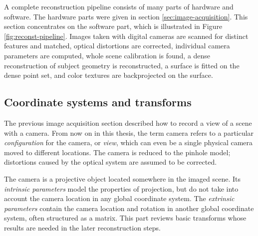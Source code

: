 A complete reconstruction pipeline consists of many parts of hardware and software.
The hardware parts were given in section \ref{sec:image-acquisition}.
This section concentrates on the software part, which is illustrated in Figure \ref{fig:reconst-pipeline}.
Images taken with digital cameras are scanned for distinct features and matched, optical distortions are corrected, individual camera parameters are computed, whole scene calibration is found, a dense reconstruction of subject geometry is reconstructed, a surface is fitted on the dense point set, and color textures are backprojected on the surface.





\subsection{Coordinate systems and transforms} \label{sec:coord} %


The previous image acquisition section described how to record a view of a scene with a camera.
From now on in this thesis, the term camera refers to a particular \emph{configuration} for the camera, or \emph{view}, which can even be a single physical camera moved to different locations.
The camera is reduced to the pinhole model; distortions caused by the optical system are assumed to be corrected.


The camera is a projective object located somewhere in the imaged scene.
Its \emph{intrinsic parameters} model the properties of projection, but do not take into account the camera location in any global coordinate system.
The \emph{extrinsic parameters} contain the camera location and rotation in another global coordinate system, often structured as a matrix.
\cite{hartley03multiview,heyden2005multiple}
This part reviews basic transforms whose results are needed in the later reconstruction steps.

